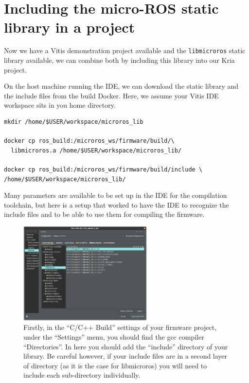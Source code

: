 \documentclass[10pt]{article}
\begin{document}
\section{Including the micro-ROS static library in a project}
Now we have a Vitis demonstration project available and the \verb|libmicroros| static library
available, we can combine both by including this library into our Kria project.

On the host machine running the IDE, we can download the static library and the include files from the build Docker.
Here, we assume your Vitis IDE workspace sits in you home directory.
\begin{tcolorbox}
\begin{verbatim}
mkdir /home/$USER/workspace/microros_lib

docker cp ros_build:/microros_ws/firmware/build/\
  libmicroros.a /home/$USER/workspace/microros_lib/

docker cp ros_build:/microros_ws/firmware/build/include \
/home/$USER/workspace/microros_lib/
\end{verbatim}
\end{tcolorbox}

Many parameters are available to be set up in the IDE for the compilation toolchain, but here is
a setup that worked to have the IDE to recognize the include files and to be able to use them
for compiling the firmware.

\begin{figure}[H]
  \centering
  \includegraphics[width=0.6\textwidth]{./img/vitis_new/include}
  \caption{Firstly, in the ``C/C++ Build'' settings of your firmware project, under the ``Settings'' menu, you should find the gcc compiler
    ``Directories''. In here you should add the ``include'' directory of your library. Be careful however, if your include files are in
  a second layer of directory (as it is the case for libmicroros) you will need to include each sub-directory individually.}
\end{figure}
\end{document}
